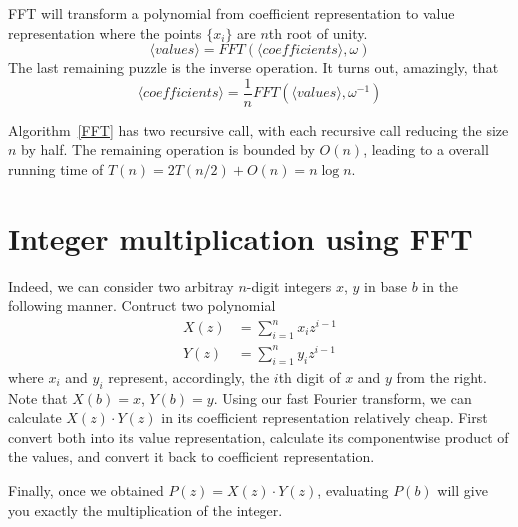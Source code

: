 \documentclass[12pt,a4paper]{amsart}
\numberwithin{equation}{section}
\theoremstyle{plain}
\theoremstyle{definition}
\begin{document}
FFT will transform a polynomial from coefficient representation to value representation where
the points $\{x_i\}$ are $n$th root of unity. 
$$ \langle \textit{values} \rangle = FFT(\langle \textit{coefficients}\rangle, \omega) $$
The last remaining puzzle is the inverse operation. It turns out, amazingly, that
$$ \langle \textit{coefficients} \rangle = \frac{1}{n} FFT(\langle \textit{values} \rangle, \omega^{-1}) $$


Algorithm~\ref{FFT} has two recursive call, with each recursive call reducing the size $n$ by half.
The remaining operation is bounded by $O(n)$, leading to
a overall running time of $T(n) = 2T(n/2) + O(n) = n \log n$.
\section{Integer multiplication using FFT}
Indeed, we can consider two arbitray $n$-digit integers $x$, $y$ in base $b$ in the following manner.
Contruct two polynomial
\begin{align*}
    X(z) &= \sum_{i = 1}^{n} x_i z^{i - 1} \\
    Y(z) &= \sum_{i = 1}^{n} y_i z^{i - 1}
\end{align*}
where $x_i$ and $y_i$ represent, accordingly, the $i$th digit of $x$ and $y$ from the right.
Note that $X(b) = x$, $Y(b) = y$. Using our fast Fourier transform, we can calculate $X(z) \cdot Y(z)$ in
its coefficient representation relatively cheap. First convert both into its value representation, calculate
its componentwise product of the values, and convert it back to coefficient representation.

Finally, once we obtained $P(z) = X(z) \cdot Y(z)$, evaluating $P(b)$ will give you exactly the multiplication of
the integer.



\end{document}

